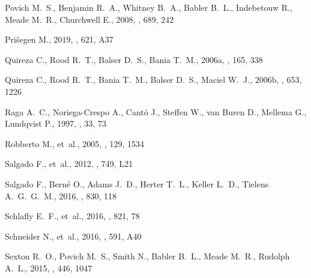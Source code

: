 \documentclass[useAMS, usenatbib, a4paper]{mnras}
\begin{document}
\begin{thebibliography}{}
{Povich} M.~S.,  {Benjamin} R.~A.,  {Whitney} B.~A.,  {Babler} B.~L.,
  {Indebetouw} R.,  {Meade} M.~R.,   {Churchwell} E.,  2008, \apj, 689, 242

{Prišegen} M.,  2019, \aap, 621, A37

{Quireza} C.,  {Rood} R.~T.,  {Balser} D.~S.,   {Bania} T.~M.,  2006a, \apjs,
  165, 338

{Quireza} C.,  {Rood} R.~T.,  {Bania} T.~M.,  {Balser} D.~S.,   {Maciel} W.~J.,
   2006b, \apj, 653, 1226

{Raga} A.~C.,  {Noriega-Crespo} A.,  {Cantó} J.,  {Steffen} W.,  {van Buren}
  D.,  {Mellema} G.,   {Lundqvist} P.,  1997, \rmxaa, 33, 73

{Robberto} M.,  et~al., 2005, \aj, 129, 1534

{Salgado} F.,  et~al., 2012, \apjl, 749, L21

{Salgado} F.,  {Berné} O.,  {Adams} J.~D.,  {Herter} T.~L.,  {Keller} L.~D.,
  {Tielens} A.~G.~G.~M.,  2016, \apj, 830, 118

{Schlafly} E.~F.,  et~al., 2016, \apj, 821, 78

{Schneider} N.,  et~al., 2016, \aap, 591, A40

{Sexton} R.~O.,  {Povich} M.~S.,  {Smith} N.,  {Babler} B.~L.,  {Meade} M.~R.,
   {Rudolph} A.~L.,  2015, \mnras, 446, 1047


\end{thebibliography}
\end{document}
